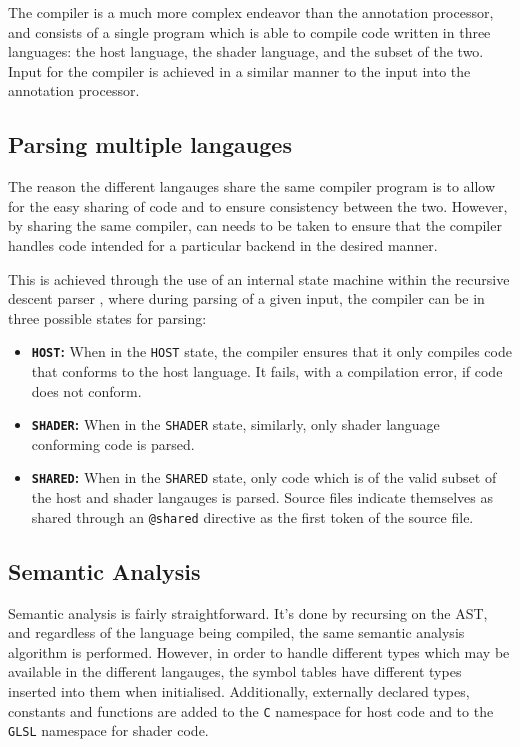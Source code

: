 \documentclass[a4paper,12pt,twoside,openright]{report}
\begin{document}
The compiler is a much more complex endeavor than the annotation processor, and
consists of a single program which is able to compile code written in three
languages: the host language, the shader language, and the subset of the two.
Input for the compiler is achieved in a similar manner to the input into the
annotation processor.

\subsection{Parsing multiple langauges}

The reason the different langauges share the same compiler program is to allow
for the easy sharing of code and to ensure consistency between the two.
However, by sharing the same compiler, can needs to be taken to ensure that the
compiler handles code intended for a particular backend in the desired manner.

This is achieved through the use of an internal state machine within the
recursive descent parser , where during parsing of a given input, the compiler
can be in three possible states for parsing:

\begin{itemize}

    \item \textbf{\texttt{HOST}:} When in the \texttt{HOST} state, the compiler
    ensures that it only compiles code that conforms to the host language. It
    fails, with a compilation error, if code does not conform.

    \item \textbf{\texttt{SHADER}:} When in the \texttt{SHADER} state,
    similarly, only shader language conforming code is parsed.

    \item \textbf{\texttt{SHARED}:} When in the \texttt{SHARED} state, only
    code which is of the valid subset of the host and shader langauges is
    parsed. Source files indicate themselves as shared through an
    \texttt{@shared} directive as the first token of the source file.

\end{itemize}

\subsection{Semantic Analysis}

Semantic analysis is fairly straightforward. It's done by recursing on the AST,
and regardless of the language being compiled, the same semantic analysis
algorithm is performed. However, in order to handle different types which may
be available in the different langauges, the symbol tables have different types
inserted into them when initialised. Additionally, externally declared types,
constants and functions are added to the \texttt{C} namespace for host code and
to the \texttt{GLSL} namespace for shader code.
\end{document}
